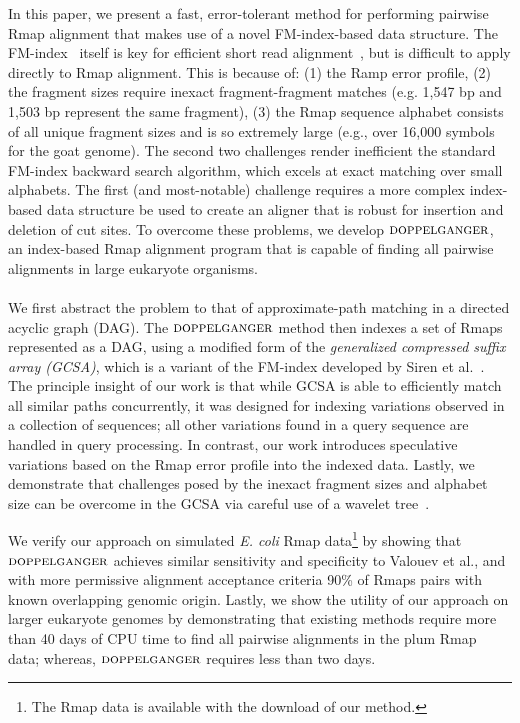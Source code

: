 In this paper, we present a fast, error-tolerant method for performing pairwise Rmap alignment that makes use of a novel FM-index-based data structure. The FM-index~\cite{fm2005} itself is key for efficient short read alignment~\cite{BWA,bowtie}, but is difficult to apply directly to Rmap alignment.  This is because of: (1) the Ramp error profile, (2) the fragment sizes require inexact fragment-fragment matches (e.g. 1,547 bp and 1,503 bp represent the same fragment), (3) the Rmap sequence alphabet consists of all unique fragment sizes and is so extremely large (e.g., over 16,000 symbols for the goat genome).  The second two challenges render inefficient the standard FM-index backward search algorithm, which excels at exact matching over small alphabets. The first (and most-notable) challenge requires a more complex index-based data structure be used to create an aligner that is robust for insertion and deletion of cut sites. To overcome these problems, we develop $\mbox{\rm {\sc doppelganger}}$, an index-based Rmap alignment program that is capable of finding all pairwise alignments in large eukaryote organisms.




\paragraph{}
We first abstract the problem to that of approximate-path matching in a directed 
acyclic graph (DAG). The $\mbox{\rm {\sc doppelganger}}$ method then indexes a set of Rmaps represented
as a DAG, using a modified form of the {\em generalized compressed suffix array (GCSA)}, which is 
a variant of the FM-index developed by Siren et al.~\cite{dag_method}.  The principle insight of our work is that while GCSA is able to efficiently match all similar paths concurrently, it was designed for indexing variations observed in a collection of sequences; all other variations found in a query sequence are handled in query processing. In contrast, our work introduces speculative variations based on the Rmap error profile into the indexed data.  Lastly, we demonstrate that challenges posed by the inexact fragment sizes and alphabet size can be overcome in the GCSA via careful use of a wavelet tree~\cite{GNPtcs11}. %

We verify our approach on simulated {\em E. coli} Rmap data\footnote{The Rmap data is available with the download of our method.} by showing that $\mbox{\rm {\sc doppelganger}}$ achieves similar sensitivity and specificity to Valouev et al., and with more permissive alignment acceptance criteria 90\% of Rmaps pairs with known overlapping genomic origin.  Lastly, we show the utility of our approach on larger eukaryote genomes by demonstrating that existing methods require more than 40 days of CPU time to find all pairwise alignments in the plum Rmap data; whereas, $\mbox{\rm {\sc doppelganger}}$ requires less than two days. 

